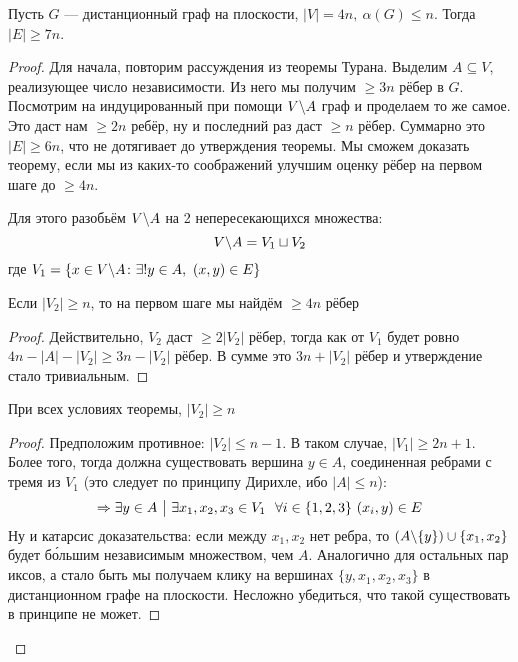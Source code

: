 \begin{theorem}
	Пусть $G$ --- дистанционный граф на плоскости, $|V| = 4n,\ \alpha(G) \le n$. Тогда $|E| \ge 7n$.
\end{theorem}

\begin{proof}
	Для начала, повторим рассуждения из теоремы Турана. Выделим $A \subseteq V$, реализующее число независимости. Из него мы получим $\ge 3n$ рёбер в $G$. Посмотрим на индуцированный при помощи $V \backslash A$ граф и проделаем то же самое. Это даст нам $\ge 2n$ ребёр, ну и последний раз даст $\ge n$ рёбер. Суммарно это $|E| \ge 6n$, что не дотягивает до утверждения теоремы. Мы сможем доказать теорему, если мы из каких-то соображений улучшим оценку рёбер на первом шаге до $\ge 4n$.
	
	Для этого разобьём $V \backslash A$ на 2 непересекающихся множества:
	\[
		V \backslash A = V_1 \sqcup V_2
	\]
	где $V_1 = \{x \in V \backslash A \colon \exists! y \in A,\ (x, y) \in E\}$
	\begin{proposition}
		Если $|V_2| \ge n$, то на первом шаге мы найдём $\ge 4n$ рёбер
	\end{proposition}

	\begin{proof}
		Действительно, $V_2$ даст $\ge 2|V_2|$ рёбер, тогда как от $V_1$ будет ровно $4n - |A| - |V_2| \ge 3n - |V_2|$ рёбер. В сумме это $3n + |V_2|$ рёбер и утверждение стало тривиальным.
	\end{proof}

	\begin{lemma}
		При всех условиях теоремы, $|V_2| \ge n$
	\end{lemma}

	\begin{proof}
		Предположим противное: $|V_2| \le n - 1$. В таком случае, $|V_1| \ge 2n + 1$. Более того, тогда должна существовать вершина $y \in A$, соединенная ребрами с тремя из $V_1$ (это следует по принципу Дирихле, ибо $|A| \le n$):
		\[
			\Rightarrow \exists y \in A \ \big|\  \exists x_1, x_2, x_3 \in V_1\ \ \forall i \in \{1, 2, 3\}\ (x_i, y) \in E
		\]
		Ну и катарсис доказательства: если между $x_1, x_2$ нет ребра, то $(A \backslash \{y\}) \cup \{x_1, x_2\}$ будет б\'{о}льшим независимым множеством, чем $A$. Аналогично для остальных пар иксов, а стало быть мы получаем клику на вершинах $\{y, x_1, x_2, x_3\}$ в дистанционном графе на плоскости. Несложно убедиться, что такой существовать в принципе не может.
	\end{proof}
\end{proof}


